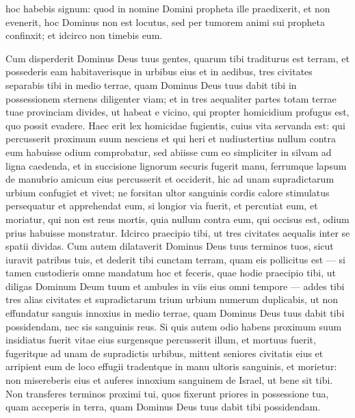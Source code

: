 \begin{biblechapter}
\begin{biblechapter}
\begin{biblechapter}
\begin{biblechapter}
\begin{biblechapter}
\begin{biblechapter}
\begin{biblechapter}
\begin{biblechapter}
\begin{biblechapter}
\begin{biblechapter}
\begin{biblechapter}
\begin{biblechapter}
\begin{biblechapter}
\begin{biblechapter}
\begin{biblechapter}
\begin{biblechapter}
\begin{biblechapter}
\begin{biblechapter}
\verse hoc habebis signum: quod in nomine Domini propheta ille praedixerit, et non evenerit, hoc Dominus non est locutus, sed per tumorem animi sui propheta confinxit; et idcirco non timebis eum.
 
\begin{biblechapter}
\verse Cum disperderit Dominus Deus tuus gentes, quarum tibi traditurus est terram, et possederis eam habitaverisque in urbibus eius et in aedibus, 
\verse tres civitates separabis tibi in medio terrae, quam Dominus Deus tuus dabit tibi in possessionem 
\verse sternens diligenter viam; et in tres aequaliter partes totam terrae tuae provinciam divides, ut habeat e vicino, qui propter homicidium profugus est, quo possit evadere.
 \verse Haec erit lex homicidae fugientis, cuius vita servanda est: qui percusserit proximum suum nesciens et qui heri et nudiustertius nullum contra eum habuisse odium comprobatur, 
\verse sed abiisse cum eo simpliciter in silvam ad ligna caedenda, et in succisione lignorum securis fugerit manu, ferrumque lapsum de manubrio amicum eius percusserit et occiderit, hic ad unam supradictarum urbium confugiet et vivet; 
\verse ne forsitan ultor sanguinis cordis calore stimulatus persequatur et apprehendat eum, si longior via fuerit, et percutiat eum, et moriatur, qui non est reus mortis, quia nullum contra eum, qui occisus est, odium prius habuisse monstratur. 
\verse Idcirco praecipio tibi, ut tres civitates aequalis inter se spatii dividas. 
\verse Cum autem dilataverit Dominus Deus tuus terminos tuos, sicut iuravit patribus tuis, et dederit tibi cunctam terram, quam eis pollicitus est 
\verse — si tamen custodieris omne mandatum hoc et feceris, quae hodie praecipio tibi, ut diligas Dominum Deum tuum et ambules in viis eius omni tempore — addes tibi tres alias civitates et supradictarum trium urbium numerum duplicabis, 
\verse ut non effundatur sanguis innoxius in medio terrae, quam Dominus Deus tuus dabit tibi possidendam, nec sis sanguinis reus.
 \verse Si quis autem odio habens proximum suum insidiatus fuerit vitae eius surgensque percusserit illum, et mortuus fuerit, fugeritque ad unam de supradictis urbibus, 
\verse mittent seniores civitatis eius et arripient eum de loco effugii tradentque in manu ultoris sanguinis, et morietur: 
\verse non misereberis eius et auferes innoxium sanguinem de Israel, ut bene sit tibi.
 \verse Non transferes terminos proximi tui, quos fixerunt priores in possessione tua, quam acceperis in terra, quam Dominus Deus tuus dabit tibi possidendam.

\end{biblechapter}
\end{biblechapter}
\end{biblechapter}
\end{biblechapter}
\end{biblechapter}
\end{biblechapter}
\end{biblechapter}
\end{biblechapter}
\end{biblechapter}
\end{biblechapter}
\end{biblechapter}
\end{biblechapter}
\end{biblechapter}
\end{biblechapter}
\end{biblechapter}
\end{biblechapter}
\end{biblechapter}
\end{biblechapter}
\end{biblechapter}

